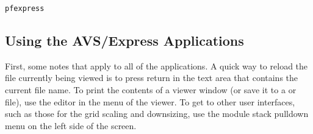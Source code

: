 \begin{display}\begin{verbatim}
pfexpress
\end{verbatim}\end{display}

\subsection{Using the AVS/Express Applications}

First, some notes that apply to all of the applications.  A quick way to
reload the file currently being viewed is to press return in the text area
that contains the current file name.  To print the contents of a viewer
window (or save it to a  or  file), use the 
editor in the  menu of the viewer.  To get to other user
interfaces, such as those for the grid scaling and downsizing, use the module
stack pulldown menu on the left side of the screen.

